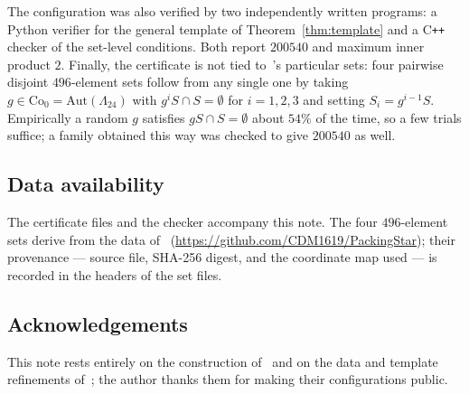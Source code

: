 \documentclass[11pt,reqno]{amsart}
\theoremstyle{plain}
\theoremstyle{remark}
\newcommand{\Lat}{\Lambda_{24}}
\begin{document}
The configuration was also verified by two independently written programs: a
Python verifier for the general template of Theorem~\ref{thm:template} and a
C\texttt{++} checker of the set-level conditions.  Both report $200540$ and
maximum inner product $2$.  Finally, the certificate is not tied
to~\cite{Ma2025}'s particular sets: four pairwise disjoint $496$-element sets
follow from any single one by taking $g \in \mathrm{Co}_{0} = \mathrm{Aut}(\Lat)$
with $g^{i}S \cap S = \emptyset$ for $i = 1,2,3$ and setting $S_{i} = g^{i-1}S$.
Empirically a random $g$ satisfies $gS \cap S = \emptyset$ about $54\%$ of the
time, so a few trials suffice; a family obtained this way was checked to give
$200540$ as well.

\subsection*{Data availability}
The certificate files and the checker accompany this note.  The four
$496$-element sets derive from the data of~\cite{Ma2025}
(\url{https://github.com/CDM1619/PackingStar}); their provenance --- source file,
SHA-256 digest, and the coordinate map used --- is recorded in the headers of the
set files.

\subsection*{Acknowledgements}
This note rests entirely on the construction of~\cite{CJKT2011} and on the data
and template refinements of~\cite{Ma2025}; the author thanks them for making
their configurations public.
\end{document}
